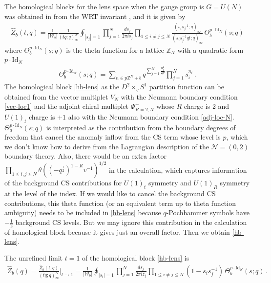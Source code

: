 \documentclass[11pt,hyper,a4paper]{article}
\begin{document}
The homological blocks for the lens space when the gauge group is $G=U(N)$ was obtained in \cite{Gukov-Putrov-Vafa} from the WRT invariant \cite{Marino2004}, and it is given by
\begin{align}
\widehat{Z}_b(t,q) = \frac{1}{|\mathcal{W}_b|} \frac{1}{(tq;q)_\infty^N} \oint_{|s_j|=1} \prod_{j=1}^N \frac{ds_j}{2 \pi i s_j} \prod_{1 \leq i \neq j \leq N} \frac{(s_i s_j^{-1};q)_\infty}{(s_i s_j^{-1} q t;q)_\infty} \, \Theta_b^{p \cdot \text{Id}_N}(s;q)	\label{hb-lens}
\end{align}
where $\Theta_b^{ p \cdot \text{Id}_N}(s;q)$ is the theta function for a lattice $\mathbb{Z}_N$ with a quadratic form $p \cdot \text{Id}_N$
\begin{align}
\Theta_b^{ p \cdot \text{Id}_N}(s;q) = \sum_{n \in p \mathbb{Z}^N + b} q^{\sum_{j=1}^N \frac{n_i^2}{2p}} \prod_{j=1}^N s_i^{n_i}	\,	.
\end{align}
The homological block \eqref{hb-lens} as the $D^2 \times_q S^1$ partition function can be obtained from the vector multiplet $V_N$ with the Neumann boundary condition \eqref{vec-loc1} and the adjoint chiral multiplet $\Phi_{R=2,N}^+$ whose $R$ charge is 2 and $U(1)_t$ charge is $+1$ also with the Neumann boundary condition \eqref{adj-loc-N}.
$\Theta_a^{ p \cdot \text{Id}_N}(s;q)$ is interpreted as the contribution from the boundary degrees of freedom that cancel the anomaly inflow from the CS term whose level is $p$, which we don't know how to derive from the Lagrangian description of the $\mathcal{N}=(0,2)$ boundary theory.
Also, there would be an extra factor $\prod_{1 \leq i,j \leq N} \theta((-q^{\frac{1}{2}})^{1-R} v^{-1})^{1/2}$ in the calculation, which captures information of the background CS contributions for $U(1)_t$ symmetry and $U(1)_R$ symmetry at the level of the index.
If we would like to cancel the background CS contributions, this theta function (or an equivalent term up to theta function ambiguity) needs to be included in \eqref{hb-lens} because $q$-Pochhammer symbols have $-\frac{1}{2}$ background CS levels.
But we may ignore this contribution in the calculation of homological block because it gives just an overall factor.
Then we obtain \eqref{hb-lens}.


The unrefined limit $t=1$ of the homological block \eqref{hb-lens} is 
\begin{align}
\widehat{Z}_b(q) = \frac{\widehat{Z}_b(t,q)}{(tq;q)_\infty^N} \bigg|_{t \rightarrow 1} = \frac{1}{|\mathcal{W}_b|} \oint_{|s_i|=1} \prod_{j=1}^N \frac{d s_j}{2 \pi i z_j} \prod_{1 \leq i \neq j \leq N} (1-s_i s_j^{-1}) \, \Theta_b^{p \cdot \text{Id}_N}(s;q)	\,	.
\end{align}
\\
\end{document}
